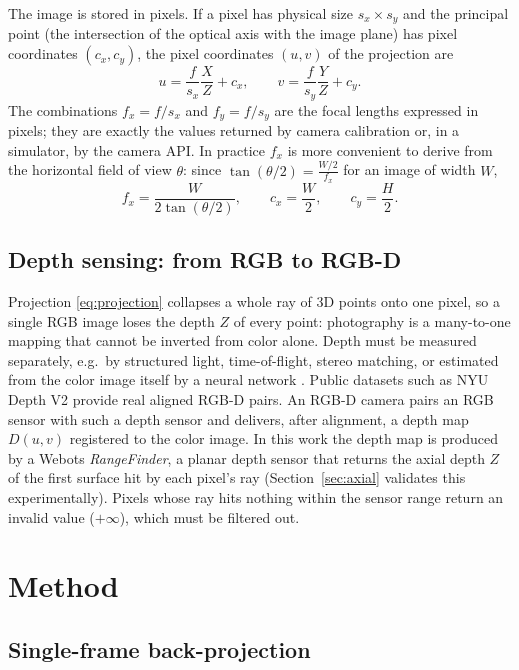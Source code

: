 \documentclass[11pt,a4paper]{article}
\begin{document}
The image is stored in pixels. If a pixel has physical size $s_x\times s_y$
and the principal point (the intersection of the optical axis with the image
plane) has pixel coordinates $(c_x,c_y)$, the pixel coordinates $(u,v)$ of the
projection are
\begin{equation}
u=\frac{f}{s_x}\frac{X}{Z}+c_x,\qquad
v=\frac{f}{s_y}\frac{Y}{Z}+c_y.
\label{eq:projection}
\end{equation}
The combinations $f_x=f/s_x$ and $f_y=f/s_y$ are the focal lengths expressed in
pixels; they are exactly the values returned by camera calibration or, in a
simulator, by the camera API. In practice $f_x$ is more convenient to derive
from the horizontal field of view $\theta$: since
$\tan(\theta/2)=\frac{W/2}{f_x}$ for an image of width $W$,
\begin{equation}
f_x=\frac{W}{2\tan(\theta/2)},\qquad c_x=\frac{W}{2},\qquad c_y=\frac{H}{2}.
\label{eq:fov}
\end{equation}

\subsection{Depth sensing: from RGB to RGB-D}

Projection \eqref{eq:projection} collapses a whole ray of 3D points onto one
pixel, so a single RGB image loses the depth $Z$ of every point: photography is
a many-to-one mapping that cannot be inverted from color alone. Depth must be
measured separately, e.g.\ by structured light, time-of-flight, stereo
matching, or estimated from the color image itself by a neural network
\cite{densedepth}. Public datasets such as NYU Depth V2 \cite{nyudepth} provide
real aligned RGB-D pairs. An RGB-D camera pairs an RGB sensor with such a depth sensor and
delivers, after alignment, a depth map $D(u,v)$ registered to the color image.
In this work the depth map is produced by a Webots \emph{RangeFinder}, a planar
depth sensor that returns the axial depth $Z$ of the first surface hit by each
pixel's ray (Section~\ref{sec:axial} validates this experimentally). Pixels
whose ray hits nothing within the sensor range return an invalid value
($+\infty$), which must be filtered out.

\section{Method}

\subsection{Single-frame back-projection}
\end{document}
